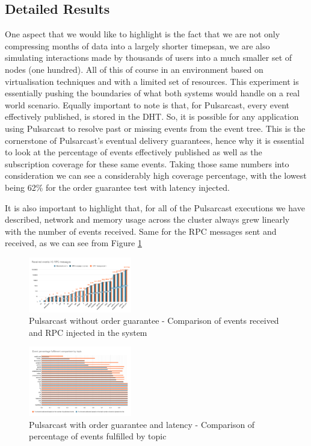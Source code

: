 \subsection{Detailed Results}
\label{ap:sub:detailed-results}

One aspect that we would like to highlight is the fact that we are not only
compressing months of data into a largely shorter timepsan, we are also
simulating interactions made by thousands of users into a much smaller set of
nodes (one hundred). All of this of course in an environment based on
virtualisation techniques and with a limited set of resources. This experiment
is essentially pushing the boundaries of what both systems would handle on a
real world scenario. Equally important to note is that, for Pulsarcast, every
event effectively published, is stored in the DHT. So, it is possible for any
application using Pulsarcast to resolve past or missing events from the event
tree. This is the cornerstone of Pulsarcast's eventual delivery guarantees,
hence why it is essential to look at the percentage of events effectively
published as well as the subscription coverage for these same events. Taking
those same numbers into consideration we can see a considerably high coverage
percentage, with the lowest being 62\% for the order guarantee test with
latency injected.

It is also important to highlight that, for all of the Pulsarcast executions we
have described, network and memory usage across the cluster always grew
linearly with the number of events received. Same for the RPC messages sent and
received, as we can see from Figure \ref{fig:graph-pulsarcast-rpc}

\begin{figure}[!htb]
  \centering
  \includegraphics[width=0.4\textwidth]{../images/graph-pulsarcast-rpc.png}
  \caption{Pulsarcast without order guarantee - Comparison of events received and RPC injected in the system}
  \label{fig:graph-pulsarcast-rpc}
\end{figure}

\begin{figure}[!htb]
  \centering
  \includegraphics[width=0.4\textwidth]{../images/graph-pulsarcast-order-latency-event-percentage-fulfillment-comparison.png}
  \caption{Pulsarcast with order guarantee and latency - Comparison of percentage of events fulfilled by topic}
  \label{fig:graph-pulsarcast-order-latency-event-percentage-fulfillment-comparison}
\end{figure}

